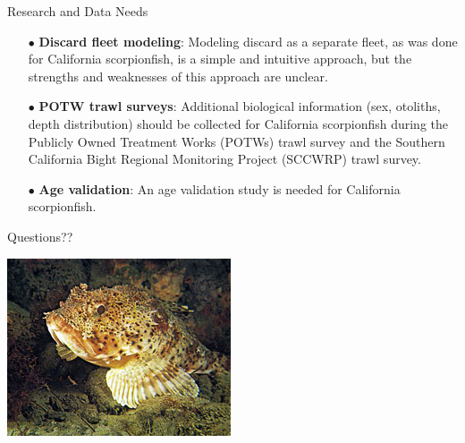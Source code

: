 \documentclass[ignorenonframetext,]{beamer}
\begin{document}
\begin{frame}{Research and Data Needs}

\begin{itemize}

\item[$\bullet$] \textbf{Discard fleet modeling}: Modeling discard as a separate fleet, as 
was done for California scorpionfish, is a simple and intuitive approach, but 
the strengths and weaknesses of this approach are unclear.

\item[$\bullet$] \textbf{POTW trawl surveys}: Additional biological information 
(sex, otoliths, depth distribution) should be collected for California 
scorpionfish during the Publicly Owned Treatment Works (POTWs) trawl 
survey and the Southern California Bight Regional Monitoring Project 
(SCCWRP) trawl survey.

\item[$\bullet$] \textbf{Age validation}: An age validation study is needed for 
California scorpionfish.

\end{itemize}

\end{frame}

\begin{frame}{Questions??}

\includegraphics[width=\textwidth]{cover_photo}

\end{frame}
\end{document}
